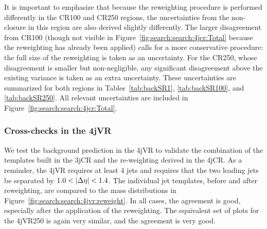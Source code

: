 It is important to emphasize that because the reweighting procedure is performed differently in the CR100 and CR250 regions, the uncertainties from the non-closure in this region are also derived slightly differently. The larger disagreement from CR100 (though not visible in Figure~\ref{fig:search:search:4jcr:Total} because the reweighting has already been applied) calls for a more conservative procedure: the full size of the reweighting is taken as an uncertainty. For the CR250,  whose disagreement is smaller but non-negligible, any significant disagreement above the existing variance is taken as an extra uncertainty. These uncertainties are summarized for both regions in Tables~\ref{tab:backSR1}, \ref{tab:backSR100}, and \ref{tab:backSR250}. All relevant uncertainties are included in Figure~\ref{fig:search:search:4jcr:Total}.



\subsubsection{Cross-checks in the 4jVR}


We test the background prediction in the 4jVR to validate the combination of the templates built in the 3jCR and the re-weighting derived in the 4jCR. As a reminder, the 4jVR requires at least 4 jets and requires that the two leading jets be separated by $1.0 < |\Delta\eta| < 1.4$. The individual jet templates, before and after reweighting, are compared to the mass distributions in Figure~\ref{fig:search:search:4jvr:reweight}. In all cases, the agreement is good, especially after the application of the reweighting. The equivalent set of plots for the 4jVR250 is again very similar, and the agreement is very good. %

